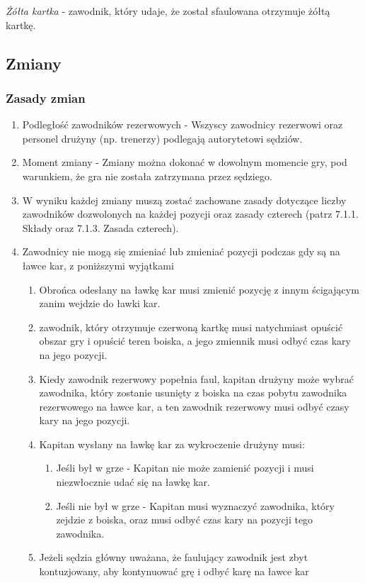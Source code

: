 \documentclass[12pt]{article}
\begin{document}
\emph{Żółta kartka} - zawodnik, który udaje, że został sfaulowana
otrzymuje żółtą kartkę.

\subsection{Zmiany}

\subsubsection{Zasady zmian}

\begin{enumerate}
	\item
	      Podległość zawodników rezerwowych - Wszyscy zawodnicy
	      rezerwowi oraz personel drużyny (np. trenerzy) podlegają autorytetowi
	      sędziów.
	\item
	      Moment zmiany - Zmiany można dokonać w dowolnym momencie gry,
	      pod warunkiem, że gra nie została zatrzymana przez sędziego.
	\item
	      W wyniku każdej zmiany muszą zostać zachowane zasady dotyczące liczby
	      zawodników dozwolonych na każdej pozycji oraz zasady czterech (patrz
	      7.1.1. Składy oraz 7.1.3. Zasada czterech).
	\item
	      Zawodnicy nie mogą się zmieniać lub zmieniać pozycji podczas gdy są na
	      ławce kar, z poniższymi wyjątkami

	      \begin{enumerate}
		      \item
		            Obrońca odesłany na ławkę kar musi zmienić pozycję z innym
		            ścigającym zanim wejdzie do ławki kar.
		      \item
		            zawodnik, który otrzymuje czerwoną kartkę musi natychmiast opuścić
		            obszar gry i opuścić teren boiska, a jego zmiennik musi odbyć czas
		            kary na jego pozycji.
		      \item
		            Kiedy zawodnik rezerwowy popełnia faul, kapitan drużyny może wybrać
		            zawodnika, który zostanie usunięty z boiska na czas pobytu zawodnika
		            rezerwowego na ławce kar, a ten zawodnik rezerwowy musi odbyć czasy
		            kary na jego pozycji.
		      \item
		            Kapitan wysłany na ławkę kar za wykroczenie drużyny musi:

		            \begin{enumerate}
			            \item
			                  Jeśli był w grze - Kapitan nie może zamienić pozycji i musi
			                  niezwłocznie udać się na ławkę kar.
			            \item
			                  Jeśli nie był w grze - Kapitan musi wyznaczyć zawodnika, który
			                  zejdzie z boiska, oraz musi odbyć czas kary na pozycji tego
			                  zawodnika.
		            \end{enumerate}
		      \item
		            Jeżeli sędzia główny uważana, że faulujący zawodnik jest zbyt
		            kontuzjowany, aby kontynuować grę i odbyć karę na ławce kar


\end{enumerate}
\end{enumerate}
\end{document}
